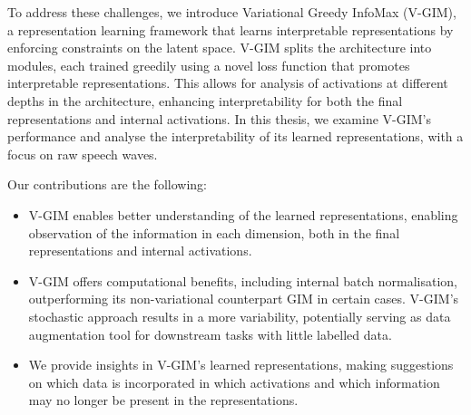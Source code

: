 To address these challenges, we introduce Variational Greedy InfoMax (V-GIM), a representation learning framework that learns interpretable representations by enforcing constraints on the latent space. V-GIM splits the architecture into modules, each trained greedily using a novel loss function that promotes interpretable representations. This allows for analysis of activations at different depths in the architecture, enhancing interpretability for both the final representations and internal activations. In this thesis, we examine V-GIM's performance and analyse the interpretability of its learned representations, with a focus on raw speech waves.



Our contributions are the following:
\begin{itemize}
	\item V-GIM enables better understanding of the learned representations, enabling observation of the information in each dimension, both in the final representations and internal activations. %
	\item V-GIM offers computational benefits, including internal batch normalisation, outperforming its non-variational counterpart GIM in certain cases. V-GIM's stochastic approach results in a more variability, potentially serving as data augmentation tool for downstream tasks with little labelled data.
	\item We provide insights in V-GIM's learned representations, making suggestions on which data is incorporated in which activations and which information may no longer be present in the representations.
\end{itemize}


%
%

